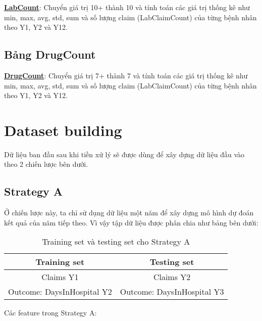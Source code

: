 \textbf{\underline{LabCount}}: Chuyển giá trị 10+ thành 10 và tính toán các giá trị thống kê như min, max, avg, std, sum và số lượng claim (LabClaimCount) của từng bệnh nhân theo Y1, Y2 và Y12.

\subsection{Bảng DrugCount}

\textbf{\underline{DrugCount}}: Chuyển giá trị 7+ thành 7 và tính toán các giá trị thống kê như min, max, avg, std, sum và số lượng claim (LabClaimCount) của từng bệnh nhân theo Y1, Y2 và Y12.

\section{Dataset building}

Dữ liệu ban đầu sau khi tiền xử lý sẽ được dùng để xây dựng dữ liệu đầu vào theo 2 chiến lược bên dưới.

\subsection{Strategy A}

Ở chiến lược này, ta chỉ sử dụng dữ liệu một năm để xây dựng mô hình dự đoán kết quả của năm tiếp theo. Vì vậy tập dữ liệu được phân chia như bảng bên dưới:

\begin{table}[h!]
    \centering
    \begin{tabular}{|c c|} 
     \hline
     Training set & Testing set \\
     \hline\hline
     Claims Y1 & Claims Y2 \\
     Outcome: DaysInHospital Y2 &  Outcome: DaysInHospital Y3\\
     \hline
    \end{tabular}
    \caption{Training set và testing set cho Strategy A}
    \label{table:1}
\end{table}

Các feature trong Strategy A:

